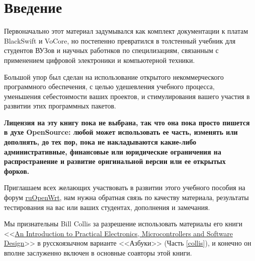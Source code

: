 \section*{Введение}

Первоначально этот материал задумывался как комплект документации к платам
BlackSwift и VoCore, но постепенно превратился в толстенный учебник для
студентов ВУЗов и научных работнков по специлизациям, связанным с применением
цифровой электроники и компьютерной техники.

Большой упор был сделан на использование открытого некоммерческого программного
обеспечения, с целью удешевления учебного процесса, уменьшения себестоимости
ваших проектов, и стимулирования вашего участия в развитии этих программных пакетов.

\bigskip
\textbf{Лицензия на эту книгу пока не выбрана, так что она пока просто пишется в
духе OpenSource: любой может использовать ее часть, изменять или дополнять, до
тех пор, пока не накладываются какие-либо административные, финансовые или
юридические ограничения на распространение и развитие оригинальной версии или ее
открытых форков.}
\bigskip

Приглашаем всех желающих участвовать в развитии этого учебного пособия на форум
\href{https://groups.google.com/forum/\#!forum/openwrt2ru}{ruOpenWrt}, нам нужна
обратная связь по качеству материала, результаты тестирования на вас или ваших
студентах, дополнения и замечания.
\bigskip

Мы признательны Bill Collis за разрешение использовать материалы его книги
<<\href{www.techideas.co.nz}{An Introduction to 
Practical Electronics, 
Microcontrollers and
Software Design}>> в
русскоязычном варианте <<Азбуки>> (Часть \ref{collis}), и конечно он вполне
заслуженно включен в основные соавторы этой книги.
